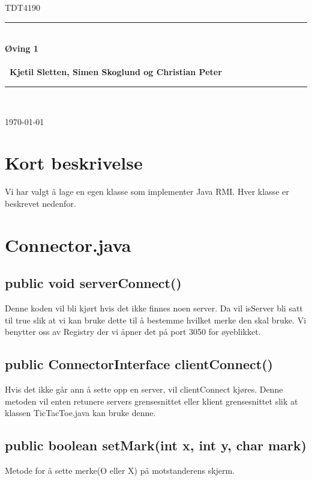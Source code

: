 \documentclass[11pt, a4paper]{article}	%
\begin{document}
\begin{titlepage}
\newcommand{\HRule}{\rule{\linewidth}{0.5mm}}
 
\begin{center}
 

\textsc{\huge TDT4190 }\\[2.0cm]

 
\HRule \\[0.3cm]
{\huge \bfseries  Øving  1
\\\ \\\ \LARGE Kjetil Sletten, Simen Skoglund og Christian Peter }\\[0.4cm]
\HRule \\[1.5cm]
 
\vfill
 
{\large \today}
 
\end{center}
\end{titlepage}

\section{Kort beskrivelse}
Vi har valgt å lage en egen klasse som implementer Java RMI. Hver klasse er beskrevet nedenfor.

\section{Connector.java}
\subsection*{public void serverConnect()}
Denne koden vil bli kjørt hvis det ikke finnes noen server. Da vil isServer bli satt til true slik at vi kan bruke dette til å bestemme hvilket merke den skal bruke. Vi benytter oss av Registry der vi åpner det på port 3050 for øyeblikket.
\subsection*{public ConnectorInterface clientConnect()}
Hvis det ikke går ann å sette opp en server, vil clientConnect kjøres. Denne metoden vil enten retunere servers grensesnittet eller klient grensesnittet slik at klassen TicTacToe.java kan bruke denne.


\subsection*{public boolean setMark(int x, int y, char mark)}
Metode for å sette merke(O eller X) på motstanderens skjerm.
\end{document}
